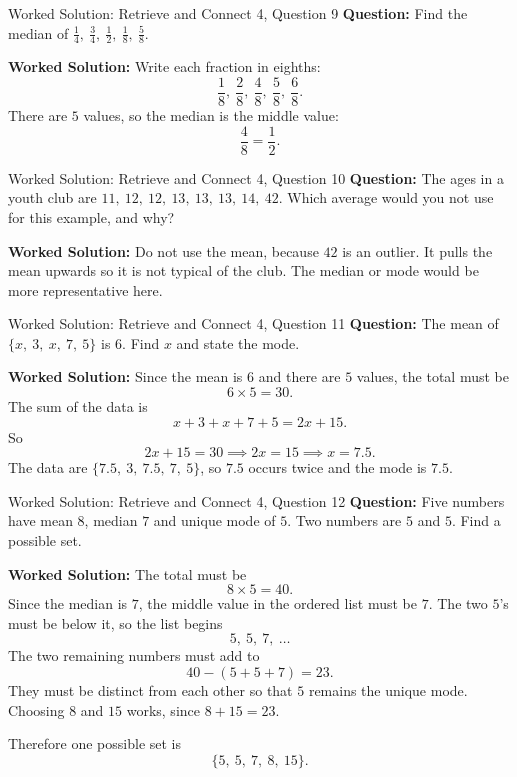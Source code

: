 \documentclass{beamer}
\begin{document}
\begin{frame}{Worked Solution: Retrieve and Connect 4, Question 9}
\small
\textbf{Question:} Find the median of \(\frac14,\ \frac34,\ \frac12,\ \frac18,\ \frac58\).

\smallskip
\textbf{Worked Solution:} Write each fraction in eighths:
\[
\frac18,\ \frac28,\ \frac48,\ \frac58,\ \frac68.
\]
There are \(5\) values, so the median is the middle value:
\[
\frac48=\frac12.
\]
\end{frame}

\begin{frame}{Worked Solution: Retrieve and Connect 4, Question 10}
\small
\textbf{Question:} The ages in a youth club are \(11,\ 12,\ 12,\ 13,\ 13,\ 13,\ 14,\ 42\). Which average would you not use for this example, and why?

\smallskip
\textbf{Worked Solution:} Do not use the mean, because \(42\) is an outlier. It pulls the mean upwards so it is not typical of the club. The median or mode would be more representative here.
\end{frame}

\begin{frame}{Worked Solution: Retrieve and Connect 4, Question 11}
\small
\textbf{Question:} The mean of \(\{x,\ 3,\ x,\ 7,\ 5\}\) is \(6\). Find \(x\) and state the mode.

\smallskip
\textbf{Worked Solution:} Since the mean is \(6\) and there are \(5\) values, the total must be
\[
6\times5=30.
\]
The sum of the data is
\[
x+3+x+7+5=2x+15.
\]
So
\[
2x+15=30 \implies 2x=15 \implies x=7.5.
\]
The data are \(\{7.5,\ 3,\ 7.5,\ 7,\ 5\}\), so \(7.5\) occurs twice and the mode is \(7.5\).
\end{frame}

\begin{frame}{Worked Solution: Retrieve and Connect 4, Question 12}
\small
\textbf{Question:} Five numbers have mean \(8\), median \(7\) and unique mode of \(5\). Two numbers are \(5\) and \(5\). Find a possible set.

\smallskip
\textbf{Worked Solution:} The total must be
\[
8\times5=40.
\]
Since the median is \(7\), the middle value in the ordered list must be \(7\). The two \(5\)'s must be below it, so the list begins
\[
5,\ 5,\ 7,\ \dots
\]
The two remaining numbers must add to
\[
40-(5+5+7)=23.
\]
They must be distinct from each other so that \(5\) remains the unique mode. Choosing \(8\) and \(15\) works, since \(8+15=23\).

Therefore one possible set is
\[
\{5,\ 5,\ 7,\ 8,\ 15\}.
\]
\end{frame}
\end{document}
